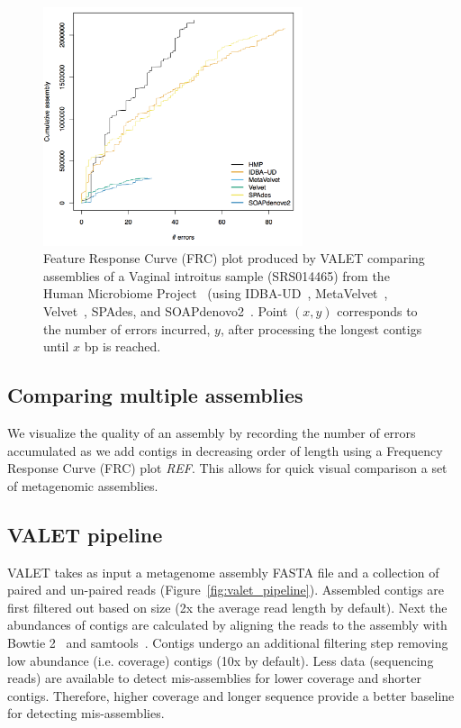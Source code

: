 \documentclass{bioinfo}
\begin{document}
\begin{figure}[tb!]
\begin{center}
\includegraphics[width=3in]{figures/frc}
\end{center}
\caption[hmp_frc]{Feature Response Curve (FRC) plot produced by VALET comparing assemblies of a Vaginal introitus sample (SRS014465) from the Human Microbiome Project~\citep{human2012structure} (using IDBA-UD~\citep{peng2012idba}, MetaVelvet~\citep{namiki2012metavelvet}, Velvet~\citep{zerbino2008velvet}, SPAdes\citep{bankevich2012spades}, and SOAPdenovo2~\citep{luo2012soapdenovo2}. Point $(x,y)$ corresponds to the number of errors incurred, $y$, after processing the longest contigs until $x$ bp is reached.}
\label{fig:hmp_frc}
\end{figure}

\subsection{Comparing multiple assemblies}

We visualize the quality of an assembly by recording the number of errors accumulated as we add contigs in decreasing order of length using a Frequency Response Curve (FRC) plot \emph{REF}.
This allows for quick visual comparison a set of metagenomic assemblies.


\subsection{VALET pipeline}

VALET takes as input a metagenome assembly \textsc{FASTA} file and a collection of paired and un-paired reads (Figure~\ref{fig:valet_pipeline}).
Assembled contigs are first filtered out based on size (2x the average read length by default).
Next the abundances of contigs are calculated by aligning the reads to the assembly with Bowtie 2~\citep{langmead2012fast} and samtools~\citep{li2009sequence}.
Contigs undergo an additional filtering step removing low abundance (i.e. coverage) contigs (10x by default).
Less data (sequencing reads) are available to detect mis-assemblies for lower coverage and shorter contigs. 
Therefore, higher coverage and longer sequence provide a better baseline for detecting mis-assemblies.
\end{document}
